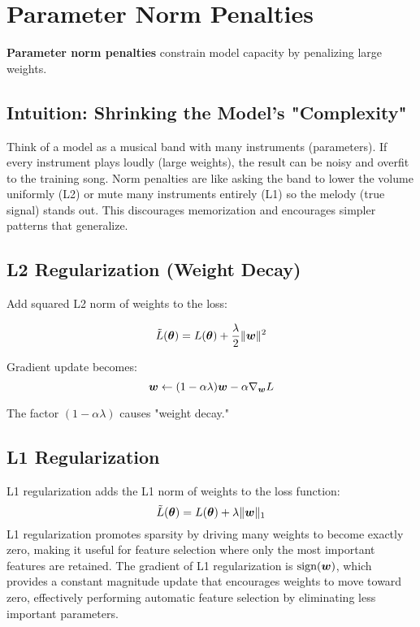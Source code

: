 
\section{Parameter Norm Penalties }
\label{sec:parameter-penalties}

\textbf{Parameter norm penalties} constrain model capacity by penalizing large weights.

\subsection{Intuition: Shrinking the Model's "Complexity"}

Think of a model as a musical band with many instruments (parameters). If every instrument plays loudly (large weights), the result can be noisy and overfit to the training song. Norm penalties are like asking the band to lower the volume uniformly (L2) or mute many instruments entirely (L1) so the melody (true signal) stands out. This discourages memorization and encourages simpler patterns that generalize.

\subsection{L2 Regularization (Weight Decay)}

Add squared L2 norm of weights to the loss:

\begin{equation}
\tilde{L}(\boldsymbol{\theta}) = L(\boldsymbol{\theta}) + \frac{\lambda}{2} \|\boldsymbol{w}\|^2
\end{equation}

Gradient update becomes:
\begin{equation}
\boldsymbol{w} \leftarrow (1 - \alpha\lambda)\boldsymbol{w} - \alpha \nabla_{\boldsymbol{w}} L
\end{equation}

The factor $(1 - \alpha\lambda)$ causes "weight decay."

\subsection{L1 Regularization}

L1 regularization adds the L1 norm of weights to the loss function:
\begin{equation}
\tilde{L}(\boldsymbol{\theta}) = L(\boldsymbol{\theta}) + \lambda \|\boldsymbol{w}\|_1
\end{equation}
L1 regularization promotes sparsity by driving many weights to become exactly zero, making it useful for feature selection where only the most important features are retained. The gradient of L1 regularization is $\text{sign}(\boldsymbol{w})$, which provides a constant magnitude update that encourages weights to move toward zero, effectively performing automatic feature selection by eliminating less important parameters.

